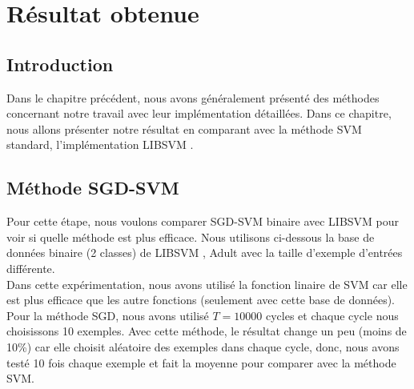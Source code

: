 \chapter{Résultat obtenue}
\label{chap:res}

\section{Introduction}
Dans le chapitre précédent, nous avons généralement présenté des méthodes concernant notre travail avec leur implémentation détaillées. Dans ce chapitre, nous allons présenter notre résultat en comparant avec la méthode SVM standard, l'implémentation LIBSVM \cite{cl01}.

\section{Méthode SGD-SVM}
Pour cette étape, nous voulons comparer SGD-SVM binaire avec LIBSVM pour voir si quelle méthode est plus efficace. Nous utilisons ci-dessous la base de données binaire (2 classes) de LIBSVM \cite{svmdata1}, Adult avec la taille d'exemple d'entrées différente.\\

Dans cette expérimentation, nous avons utilisé la fonction linaire de SVM car elle est plus efficace que les autre fonctions (seulement avec cette base de données). Pour la méthode SGD, nous avons utilisé $T = 10000$ cycles et chaque cycle nous choisissons 10 exemples. Avec cette méthode, le résultat change un peu (moins de 10\%) car elle choisit aléatoire des exemples dans chaque cycle, donc, nous avons testé 10 fois chaque exemple et fait la moyenne pour comparer avec la méthode SVM.

